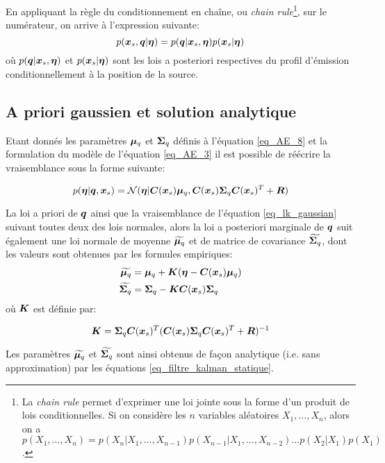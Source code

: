 En appliquant la règle du conditionnement en chaîne, ou \textit{chain rule}\footnote{La \textit{chain rule} permet d'exprimer une loi jointe sous la forme d'un produit de lois conditionnelles. Si on considère les $n$ variables aléatoires $X_1, \dots, X_n$, alors on a $p(X_1, \dots, X_n) = p(X_n|X_1, \dots, X_{n-1})p(X_{n-1}|X_1, \dots, X_{n-2})\dots p(X_2|X_1)p(X_1)$.}, sur le numérateur, on arrive à l'expression suivante:
\begin{equation}
p({\bm{x}_s}, {\bm{q}} | {\bm{\eta}}) = p({\bm{q}} | {\bm{x}_s}, {\bm{\eta}})p({\bm{x}_s} | {\bm{\eta}})
\label{eq_AE_9}
\end{equation}
où $p({\bm{q}} | {\bm{x}_s}, {\bm{\eta}})$ et $p({\bm{x}_s} | {\bm{\eta}})$ sont {les lois a posteriori respectives du profil d'émission conditionnellement à la position de la source}. \\

\subsection{A priori gaussien et solution analytique}


{
	Etant donnés les paramètres ${\bm{\mu}_q}$ et ${\bm{\Sigma}}_q$ définis à l'équation \eqref{eq_AE_8} et la formulation du modèle de l'équation \eqref{eq_AE_3}  il est possible de réécrire la vraisemblance sous la forme suivante:
	
	\begin{equation}
		p({\bm{\eta}} | {\bm{q}}, {\bm{x}_s}) = \mathcal{N}({\bm{\eta}} | {\bm{C}}({\bm{x}_s}){\bm{\mu}_q}, {\bm{C}}({\bm{x}_s}){\bm{\Sigma}}_q{\bm{C}}({\bm{x}_s})^T + {\bm{R}})
		\label{eq_lk_gaussian}
	\end{equation}
	
	La loi a priori de ${\bm{q}}$ ainsi que la vraisemblance de l'équation \eqref{eq_lk_gaussian} suivant toutes deux des lois normales, alors la loi a posteriori marginale de ${\bm{q}}$ suit également une loi normale de moyenne ${\widetilde{\bm{\mu}_q}}$ et de matrice de covariance ${\widetilde{\bm{\Sigma}_q}}$, dont les valeurs sont obtenues par les formules empiriques: 
	 \begin{equation}
	 \begin{split}
	 {\widetilde{\bm{\mu}_q}} & = {\bm{\mu}_q} + {\bm{K}}({\bm{\eta}} - {\bm{C}}({\bm{x}_s}){\bm{\mu}_q}) \\
	 {\widetilde{\bm{\Sigma}_q}} & = {\bm{\Sigma}_q} - {\bm{K}}{\bm{C}}({\bm{x}_s}){\bm{\Sigma}_q}
	 \end{split}
	 \label{eq_filtre_kalman_statique}
	 \end{equation}
	  où ${\bm{K}}$ est définie par:
	  
	  \begin{equation}
	  {\bm{K}} = {\bm{\Sigma}_q}{\bm{C}}({\bm{x}_s})^T({\bm{C}}({\bm{x}_s}){\bm{\Sigma}_q}{\bm{C}}({\bm{x}_s})^T + {\bm{R}})^{-1}
	  \end{equation}
	
	}
  Les paramètres ${\widetilde{\bm{\mu}_q}}$ et ${\widetilde{\bm{\Sigma}_q}}$ sont ainsi obtenus de façon analytique (i.e. sans approximation) par les équations \eqref{eq_filtre_kalman_statique}. 

